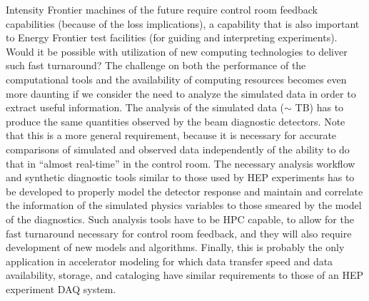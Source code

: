 Intensity Frontier machines of the future require control room
feedback capabilities (because of the loss implications), a
capability that is also important to Energy Frontier test
facilities (for guiding and interpreting experiments).   Would it
be possible with utilization of new computing technologies to
deliver such fast turnaround?  The challenge on both the
performance of the computational tools and the availability of
computing resources becomes even  more daunting if we consider
the need to analyze the simulated data in order to extract useful
information.  The analysis of the simulated data ($\sim$ TB) has
to produce the same quantities observed by the beam diagnostic
detectors.  Note that this is a more general requirement, because
it is necessary for accurate comparisons of simulated and
observed data independently of the ability to do that in ``almost
real-time'' in the control room.  The necessary analysis workflow
and synthetic diagnostic tools similar to those used by HEP
experiments has to be developed to properly model the detector
response and maintain and correlate the information of the
simulated physics variables to those smeared by the model of the
diagnostics.  Such analysis tools have to be HPC capable, to
allow for the fast turnaround necessary for control room
feedback, and they will also require development of new models
and algorithms.  Finally, this is probably the only application
in accelerator modeling for which data transfer speed and data
availability, storage, and cataloging have similar requirements to
those of an HEP experiment DAQ system.



